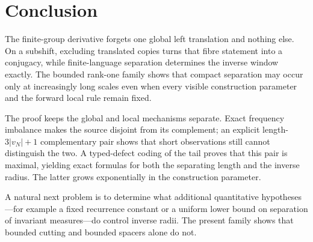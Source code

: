 \section{Conclusion}

The finite-group derivative forgets one global left translation and nothing
else.  On a subshift, excluding translated copies turns that fibre statement
into a conjugacy, while finite-language separation determines the inverse
window exactly.  The bounded rank-one family shows that compact separation
may occur only at increasingly long scales even when every visible
construction parameter and the forward local rule remain fixed.

The proof keeps the global and local mechanisms separate.  Exact frequency
imbalance makes the source disjoint from its complement; an explicit
length-$3|v_N|+1$ complementary pair shows that short observations still
cannot distinguish the two.  A typed-defect coding of the tail proves that
this pair is maximal, yielding exact formulas for both the separating length
and the inverse radius.  The latter grows exponentially in the construction
parameter.

A natural next problem is to determine what additional quantitative
hypotheses---for example a fixed recurrence constant or a uniform lower bound
on separation of invariant measures---do control inverse radii.  The present
family shows that bounded cutting and bounded spacers alone do not.
